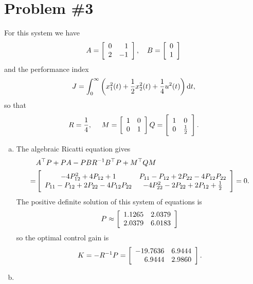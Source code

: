 \documentclass{article}
\begin{document}
\section*{Problem \#3}
For this system we have
$$
A
= \left[\begin{array}{r r}
    0 &  1 \\
    2 & -1
  \end{array}\right], \quad
B
= \left[\begin{array}{c}
    0 \\
    1
  \end{array}\right]
$$
and the performance index
$$
J = \int_0^\infty
      \left(
        x_1^2(t) + \frac{1}{2} x_2^2(t) + \frac{1}{4}u^2(t)
      \right) \dif t,
$$
so that
$$
R = \frac{1}{4}, \quad\
M = \left[\begin{array}{c c}
      1 & 0 \\
      0 & 1
    \end{array}\right]
Q = \left[\begin{array}{c c}
      1 & 0 \\
      0 & \frac{1}{2}
    \end{array}\right].
$$

\begin{enumerate}[(a)]
  \item{
    The algebraic Ricatti equation gives
    \begin{align*}
      & A^\top P + P A - P B R^{-1} B^\top P + M^\top Q M \\
    = & \left[\begin{array}{c c}
          -4 P_{12}^2 + 4 P_{12} + 1
        &    P_{11}   -   P_{12} + 2 P_{22} - 4 P_{12} P_{22} \\
             P_{11}   -   P_{12} + 2 P_{22} - 4 P_{12} P_{22}
        & -4 P_{22}^2 - 2 P_{22} + 2 P_{12} + \frac{1}{2}
        \end{array}\right] = 0.
    \end{align*}
    The positive definite solution of this system of equations is
    $$
    P \approx
    \left[\begin{array}{r r}
      1.1265 &  2.0379 \\
      2.0379 &  6.0183
    \end{array}\right]
    $$
    so the optimal control gain is
    $$
    K = -R^{-1} P
    = \left[\begin{array}{r r}
        -19.7636 & 6.9444 \\
          6.9444 & 2.9860
      \end{array}\right].
    $$
  }
  \item{
  }
\end{enumerate}
\end{document}
